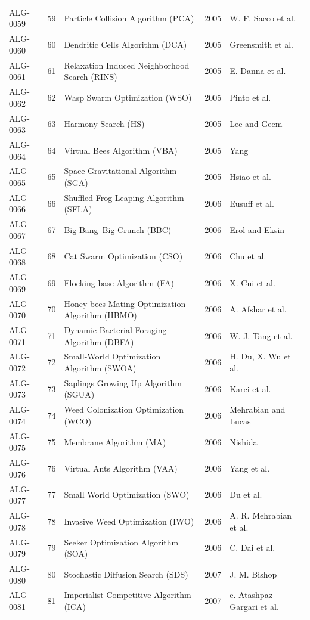 \documentclass[8pt]{article}
\begin{document}
\begin{landscape}
\begin{longtable}{P{1.7cm}rP{10.0cm}rP{7.2cm}}
ALG-0059 & 59 & Particle Collision Algorithm (PCA) & 2005 & W. F. Sacco et al. \\
ALG-0060 & 60 & Dendritic Cells Algorithm (DCA) & 2005 & Greensmith et al. \\
ALG-0061 & 61 & Relaxation Induced Neighborhood Search (RINS) & 2005 & E. Danna et al. \\
ALG-0062 & 62 & Wasp Swarm Optimization (WSO) & 2005 & Pinto et al. \\
ALG-0063 & 63 & Harmony Search (HS) & 2005 & Lee and Geem \\
ALG-0064 & 64 & Virtual Bees Algorithm (VBA) & 2005 & Yang \\
ALG-0065 & 65 & Space Gravitational Algorithm (SGA) & 2005 & Hsiao et al. \\
ALG-0066 & 66 & Shuffled Frog-Leaping Algorithm (SFLA) & 2006 & Eusuff et al. \\
ALG-0067 & 67 & Big Bang–Big Crunch (BBC) & 2006 & Erol and Eksin \\
ALG-0068 & 68 & Cat Swarm Optimization (CSO) & 2006 & Chu et al. \\
ALG-0069 & 69 & Flocking base Algorithm (FA) & 2006 & X. Cui et al. \\
ALG-0070 & 70 & Honey-bees Mating Optimization Algorithm (HBMO) & 2006 & A. Afshar et al. \\
ALG-0071 & 71 & Dynamic Bacterial Foraging Algorithm (DBFA) & 2006 & W. J. Tang et al. \\
ALG-0072 & 72 & Small-World Optimization Algorithm (SWOA) & 2006 & H. Du, X. Wu et al. \\
ALG-0073 & 73 & Saplings Growing Up Algorithm (SGUA) & 2006 & Karci et al. \\
ALG-0074 & 74 & Weed Colonization Optimization (WCO) & 2006 & Mehrabian and Lucas \\
ALG-0075 & 75 & Membrane Algorithm (MA) & 2006 & Nishida \\
ALG-0076 & 76 & Virtual Ants Algorithm (VAA) & 2006 & Yang et al. \\
ALG-0077 & 77 & Small World Optimization (SWO) & 2006 & Du et al. \\
ALG-0078 & 78 & Invasive Weed Optimization (IWO) & 2006 & A. R. Mehrabian et al. \\
ALG-0079 & 79 & Seeker Optimization Algorithm (SOA) & 2006 & C. Dai et al. \\
ALG-0080 & 80 & Stochastic Diffusion Search (SDS) & 2007 & J. M. Bishop \\
ALG-0081 & 81 & Imperialist Competitive Algorithm (ICA) & 2007 & e. Atashpaz-Gargari et al. \\

\end{longtable}
\end{landscape}
\end{document}
